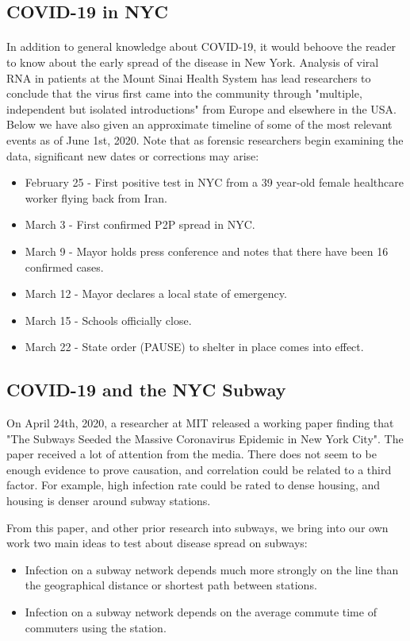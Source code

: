\documentclass[12pt, a4, epsf] {article}
\theoremstyle{plain}
\theoremstyle{definition}
\begin{document}
\subsection{COVID-19 in NYC}
\paragraph{}
In addition to general knowledge about COVID-19, it would behoove the reader to know about the early spread of the disease in New York. Analysis of viral RNA in patients at the Mount Sinai Health System has lead researchers to conclude that the virus first came into the community through "multiple, independent but isolated introductions" from Europe and elsewhere in the USA\cite{gonzalez_2020}. Below we have also given an approximate timeline of some of the most relevant events as of June 1st, 2020. Note that as forensic researchers begin examining the data, significant new dates or corrections may arise:\\ 
\begin{itemize}
	\item February 25 - First positive test in NYC from a 39 year-old female healthcare worker flying back from Iran.
	\item March 3 - First confirmed P2P spread in NYC.
	\item March 9 - Mayor holds press conference and notes that there have been 16 confirmed cases.
	\item March 12 - Mayor declares a local state of emergency.
	\item March 15 - Schools officially close.
	\item March 22 - State order (PAUSE) to shelter in place comes into effect.
\end{itemize}
\subsection{COVID-19 and the NYC Subway}
On April 24th, 2020, a researcher at MIT released a working paper finding that "The Subways Seeded the Massive Coronavirus Epidemic in New York City"\cite{subway_epidemic_seed}. The paper received a lot of attention from the media. There does not seem to be enough evidence to prove causation, and correlation could be related to a third factor. For example, high infection rate could be rated to dense housing, and housing is denser around subway stations. 

From this paper, and other prior research into subways, we bring into our own work two main ideas to test about disease spread on subways:\\
\begin{itemize}
	\item Infection on a subway network depends much more strongly on the line than the geographical distance or shortest path between stations.
	\item Infection on a subway network depends on the average commute time of commuters using the station.
\end{itemize}
\FloatBarrier
\end{document}
